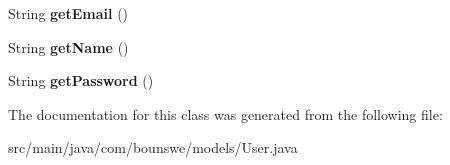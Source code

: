 \begin{DoxyCompactItemize}
\item 
\mbox{\label{classcom_1_1bounswe_1_1models_1_1_user_a54e30a0b48e3296f37f6c1398ca36234}} 
String {\bfseries get\+Email} ()
\item 
\mbox{\label{classcom_1_1bounswe_1_1models_1_1_user_a9c23f1aa306b2813ef33105f61e67c46}} 
String {\bfseries get\+Name} ()
\item 
\mbox{\label{classcom_1_1bounswe_1_1models_1_1_user_a788d42c80d474086bb413feb916afac1}} 
String {\bfseries get\+Password} ()
\end{DoxyCompactItemize}


The documentation for this class was generated from the following file\+:\begin{DoxyCompactItemize}
\item 
src/main/java/com/bounswe/models/User.\+java\end{DoxyCompactItemize}
